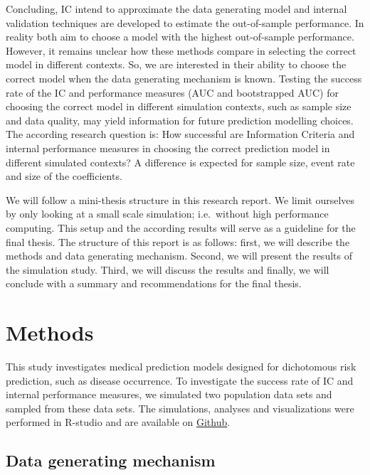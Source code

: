 \documentclass[AMA,STIX1COL]{WileyNJD-v5}
\begin{document}
Concluding, IC intend to approximate the data generating model and
internal validation techniques are developed to estimate the
out-of-sample performance. In reality both aim to choose a model with
the highest out-of-sample performance. However, it remains unclear how
these methods compare in selecting the correct model in different
contexts. So, we are interested in their ability to choose the correct
model when the data generating mechanism is known. Testing the success
rate of the IC and performance measures (AUC and bootstrapped AUC) for
choosing the correct model in different simulation contexts, such as
sample size and data quality, may yield information for future
prediction modelling choices. The according research question is: How
successful are Information Criteria and internal performance measures in
choosing the correct prediction model in different simulated contexts? A
difference is expected for sample size, event rate and size of the
coefficients.

We will follow a mini-thesis structure in this research report. We limit
ourselves by only looking at a small scale simulation; i.e.~without high
performance computing. This setup and the according results will serve
as a guideline for the final thesis. The structure of this report is as
follows: first, we will describe the methods and data generating
mechanism. Second, we will present the results of the simulation study.
Third, we will discuss the results and finally, we will conclude with a
summary and recommendations for the final thesis.

\hypertarget{sec2}{%
\section{Methods}\label{sec2}}

This study investigates medical prediction models designed for
dichotomous risk prediction, such as disease occurrence. To investigate
the success rate of IC and internal performance measures, we simulated
two population data sets and sampled from these data sets. The
simulations, analyses and visualizations were performed in R-studio
\citep{rcoreteamLanguageEnvironmentStatistical2023b} and are available
on \href{https://github.com/hiddevandebeek/Thesis}{Github}.

\hypertarget{data-generating-mechanism}{%
\subsection{Data generating mechanism}\label{data-generating-mechanism}}
\end{document}
